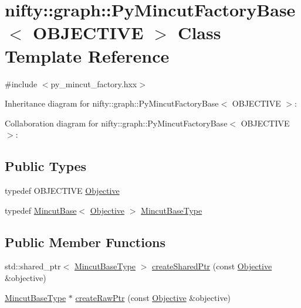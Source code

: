 \hypertarget{classnifty_1_1graph_1_1PyMincutFactoryBase}{}\section{nifty\+:\+:graph\+:\+:Py\+Mincut\+Factory\+Base$<$ O\+B\+J\+E\+C\+T\+I\+V\+E $>$ Class Template Reference}
\label{classnifty_1_1graph_1_1PyMincutFactoryBase}


{\ttfamily \#include $<$py\+\_\+mincut\+\_\+factory.\+hxx$>$}



Inheritance diagram for nifty\+:\+:graph\+:\+:Py\+Mincut\+Factory\+Base$<$ O\+B\+J\+E\+C\+T\+I\+V\+E $>$\+:


Collaboration diagram for nifty\+:\+:graph\+:\+:Py\+Mincut\+Factory\+Base$<$ O\+B\+J\+E\+C\+T\+I\+V\+E $>$\+:
\subsection*{Public Types}
\begin{DoxyCompactItemize}
\item 
typedef O\+B\+J\+E\+C\+T\+I\+V\+E \hyperlink{classnifty_1_1graph_1_1PyMincutFactoryBase_a3d2645038a14a843583a6bad59bf2ee3}{Objective}
\item 
typedef \hyperlink{classnifty_1_1graph_1_1MincutBase}{Mincut\+Base}$<$ \hyperlink{classnifty_1_1graph_1_1MincutFactoryBase_a25eccfa411235891dbe941520e7d05a6}{Objective} $>$ \hyperlink{classnifty_1_1graph_1_1PyMincutFactoryBase_a95bc60ccbb5a666677f3af0950adcdb7}{Mincut\+Base\+Type}
\end{DoxyCompactItemize}
\subsection*{Public Member Functions}
\begin{DoxyCompactItemize}
\item 
std\+::shared\+\_\+ptr$<$ \hyperlink{classnifty_1_1graph_1_1MincutFactoryBase_a287f518ec34b184ac398e0d6e8d39419}{Mincut\+Base\+Type} $>$ \hyperlink{classnifty_1_1graph_1_1PyMincutFactoryBase_a31454e9a663456f9b39363eb8f6aea71}{create\+Shared\+Ptr} (const \hyperlink{classnifty_1_1graph_1_1MincutFactoryBase_a25eccfa411235891dbe941520e7d05a6}{Objective} \&objective)
\item 
\hyperlink{classnifty_1_1graph_1_1MincutFactoryBase_a287f518ec34b184ac398e0d6e8d39419}{Mincut\+Base\+Type} $\ast$ \hyperlink{classnifty_1_1graph_1_1PyMincutFactoryBase_a0679258eb880c6abd374a65d1696e14b}{create\+Raw\+Ptr} (const \hyperlink{classnifty_1_1graph_1_1MincutFactoryBase_a25eccfa411235891dbe941520e7d05a6}{Objective} \&objective)
\end{DoxyCompactItemize}



